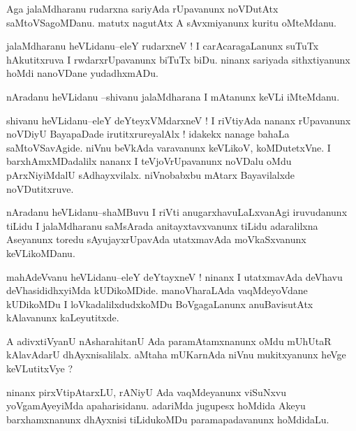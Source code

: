 \documentclass{article}
\begin{document}
\begin{mn}%
Aga jalaMdharanu rudarxna sariyAda rUpavanunx noVDutAtx saMtoVSagoMDanu. matutx nagutAtx A 
sAvxmiyanunx kuritu oMteMdanu.
\end{mn}

\begin{mn}%
jalaMdharanu heVLidanu--eleY rudarxneV ! I carAcaragaLanunx suTuTx hAkutitxruva I 
rwdarxrUpavanunx biTuTx biDu. ninanx sariyada sithxtiyanunx hoMdi nanoVDane yudadhxmADu.
\end{mn}

\begin{mn}%
nAradanu heVLidanu --shivanu jalaMdharana I mAtanunx keVLi iMteMdanu.
\end{mn}

\begin{mn}%
shivanu heVLidanu--eleY deYteyxVMdarxneV ! I riVtiyAda nananx rUpavanunx noVDiyU BayapaDade 
irutitxrureyalAlx ! idakekx nanage bahaLa saMtoVSavAgide. niVnu beVkAda varavanunx 
keVLikoV, koMDutetxVne. I barxhAmxMDadalilx nananx I teVjoVrUpavanunx noVDalu oMdu 
pArxNiyiMdalU sAdhayxvilalx. niVnobabxbu mAtarx Bayavilalxde noVDutitxruve.
\end{mn}

\begin{mn}%
nAradanu heVLidanu--shaMBuvu I riVti anugarxhavuLaLxvanAgi iruvudanunx tiLidu I jalaMdharanu 
saMsArada anitayxtavxvanunx tiLidu adaralilxna Aseyanunx toredu sAyujayxrUpavAda 
utatxmavAda moVkaSxvanunx keVLikoMDanu.
\end{mn}

\begin{mn}%
mahAdeVvanu heVLidanu--eleY deYtayxneV ! ninanx I utatxmavAda deVhavu deVhasididhxyiMda 
kUDikoMDide. manoVharaLAda vaqMdeyoVdane kUDikoMDu I loVkadalilxdudxkoMDu BoVgagaLanunx 
anuBavisutAtx kAlavanunx kaLeyutitxde.
\end{mn}

\begin{mn}%
A adivxtiVyanU nAsharahitanU Ada paramAtamxnanunx oMdu mUhUtaR kAlavAdarU dhAyxnisalilalx. 
aMtaha mUKarnAda niVnu mukitxyanunx heVge keVLutitxVye ?
\end{mn}

\begin{mn}%
ninanx pirxVtipAtarxLU, rANiyU Ada vaqMdeyanunx viSuNxvu yoVgamAyeyiMda apaharisidanu. 
adariMda jugupesx hoMdida Akeyu barxhamxnanunx dhAyxnisi tiLidukoMDu paramapadavanunx 
hoMdidaLu.
\end{mn}
\end{document}
